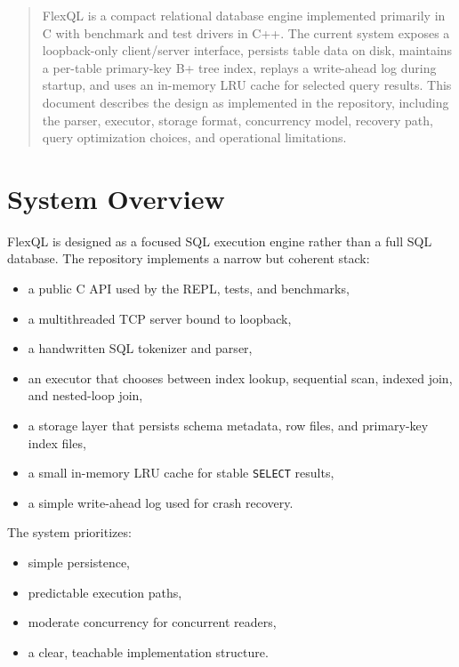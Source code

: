 \documentclass[11pt,a4paper]{article}
\begin{document}
\begin{spacing}{1.08}

\begin{abstract}
FlexQL is a compact relational database engine implemented primarily in C with benchmark and test drivers in C++. The current system exposes a loopback-only client/server interface, persists table data on disk, maintains a per-table primary-key B+ tree index, replays a write-ahead log during startup, and uses an in-memory LRU cache for selected query results. This document describes the design as implemented in the repository, including the parser, executor, storage format, concurrency model, recovery path, query optimization choices, and operational limitations.
\end{abstract}

\tableofcontents
\newpage

\section{System Overview}

FlexQL is designed as a focused SQL execution engine rather than a full SQL database. The repository implements a narrow but coherent stack:

\begin{itemize}
    \item a public C API used by the REPL, tests, and benchmarks,
    \item a multithreaded TCP server bound to loopback,
    \item a handwritten SQL tokenizer and parser,
    \item an executor that chooses between index lookup, sequential scan, indexed join, and nested-loop join,
    \item a storage layer that persists schema metadata, row files, and primary-key index files,
    \item a small in-memory LRU cache for stable \texttt{SELECT} results,
    \item a simple write-ahead log used for crash recovery.
\end{itemize}

The system prioritizes:

\begin{itemize}
    \item simple persistence,
    \item predictable execution paths,
    \item moderate concurrency for concurrent readers,
    \item a clear, teachable implementation structure.
\end{itemize}


\end{spacing}
\end{document}
